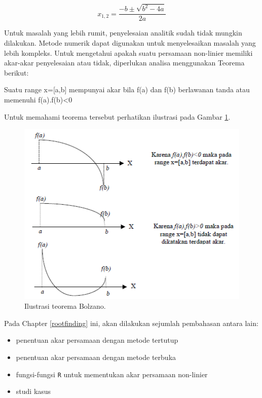 \documentclass[]{book}
\providecommand{\tightlist}{%
  \setlength{\itemsep}{0pt}\setlength{\parskip}{0pt}}
\theoremstyle{definition}
\theoremstyle{definition}
\theoremstyle{definition}
\theoremstyle{remark}
\let\BeginKnitrBlock\begin \let\EndKnitrBlock\end
\begin{document}
\begin{equation}
x_{1,2}=\frac{-b\pm\sqrt{b^2-4a}}{2a}
  \label{eq:kuadratik}
\end{equation}

Untuk masalah yang lebih rumit, penyelesaian analitik sudah tidak mungkin dilakukan. Metode numerik dapat digunakan untuk menyelesaikan masalah yang lebih kompleks. Untuk mengetahui apakah suatu persamaan non-linier memiliki akar-akar penyelesaian atau tidak, diperlukan analisa menggunakan Teorema berikut:

\BeginKnitrBlock{theorem}[root]
\protect\hypertarget{thm:unnamed-chunk-206}{}{\label{thm:unnamed-chunk-206} {} }Suatu range x={[}a,b{]} mempunyai akar bila f(a) dan f(b) berlawanan tanda atau memenuhi f(a).f(b)\textless{}0
\EndKnitrBlock{theorem}

Untuk memahami teorema tersebut perhatikan ilustrasi pada Gambar \ref{fig:Bolzano}.

\begin{figure}

{\centering \includegraphics[width=0.8\linewidth]{./images/Bolzano} 

}

\caption{Ilustrasi teorema Bolzano.}\label{fig:Bolzano}
\end{figure}

Pada Chapter \ref{rootfinding} ini, akan dilakukan sejumlah pembahasan antara lain:

\begin{itemize}
\tightlist
\item
  penentuan akar persamaan dengan metode tertutup
\item
  penentuan akar persamaan dengan metode terbuka
\item
  fungsi-fungsi \texttt{R} untuk mementukan akar persamaan non-linier
\item
  studi kasus
\end{itemize}
\end{document}
